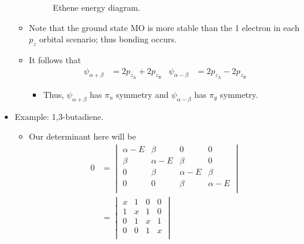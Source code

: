 \documentclass[../notes.tex]{subfiles}
\begin{document}
\begin{itemize}
\begin{itemize}
\begin{figure}[h!]
            \caption{Ethene energy diagram.}
            \label{fig:etheneEN}
        \end{figure}
        \item Note that the ground state MO is more stable than the 1 electron in each $p_z$ orbital scenario; thus bonding occurs.
        \item It follows that
        \begin{align*}
            \psi_{\alpha+\beta} &= 2p_{z_\text{A}}+2p_{z_\text{B}}&
            \psi_{\alpha-\beta} &= 2p_{z_\text{A}}-2p_{z_\text{B}}
        \end{align*}
        \begin{itemize}
            \item Thus, $\psi_{\alpha+\beta}$ has $\pi_u$ symmetry and $\psi_{\alpha-\beta}$ has $\pi_g$ symmetry.
        \end{itemize}
    \end{itemize}
    \item Example: 1,3-butadiene.
    \begin{itemize}
        \item Our determinant here will be
        \begin{align*}
            0 &=
            \begin{vmatrix}
                \alpha-E & \beta & 0 & 0\\
                \beta & \alpha-E & \beta & 0\\
                0 & \beta & \alpha-E & \beta\\
                0 & 0 & \beta & \alpha-E\\
            \end{vmatrix}\\
            &=
            \begin{vmatrix}
                x & 1 & 0 & 0\\
                1 & x & 1 & 0\\
                0 & 1 & x & 1\\
                0 & 0 & 1 & x\\

\end{vmatrix}
\end{align*}
\end{itemize}
\end{itemize}
\end{document}

